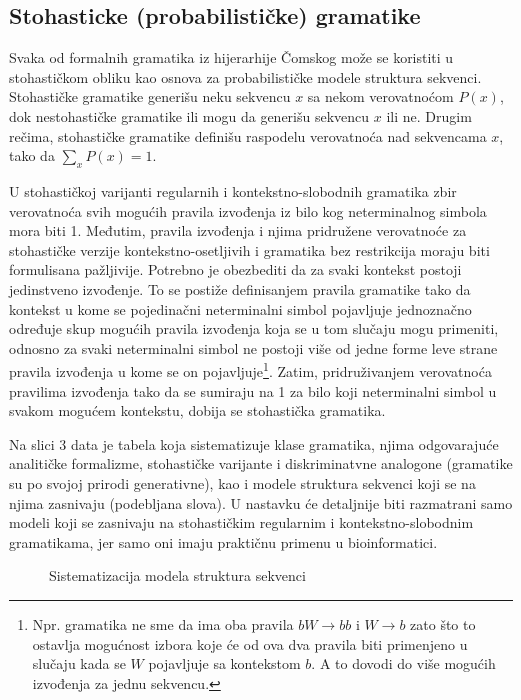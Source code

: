 \documentclass[a4paper, 12pt]{article}
\begin{document}
\subsection{Stohasticke (probabilističke) gramatike}

Svaka od formalnih gramatika iz hijerarhije Čomskog može se koristiti u stohastičkom obliku kao osnova za probabilističke modele struktura sekvenci. Stohastičke gramatike generišu neku sekvencu $x$ sa nekom verovatnoćom $P(x)$, dok nestohastičke gramatike ili mogu da generišu sekvencu $x$ ili ne. Drugim rečima, stohastičke gramatike definišu raspodelu verovatnoća nad sekvencama $x$, tako da $\sum_x P(x) = 1$.

U stohastičkoj varijanti regularnih i kontekstno-slobodnih gramatika zbir verovatnoća svih mogućih pravila izvođenja iz bilo kog neterminalnog simbola mora biti 1. Međutim, pravila izvođenja i njima pridružene verovatnoće za stohastičke verzije kontekstno-osetljivih i gramatika bez restrikcija moraju biti formulisana pažljivije. Potrebno je obezbediti da za svaki kontekst postoji jedinstveno izvođenje. To se postiže definisanjem pravila gramatike tako da kontekst u kome se pojedinačni neterminalni simbol pojavljuje jednoznačno određuje skup mogućih pravila izvođenja koja se u tom slučaju mogu primeniti, odnosno za svaki neterminalni simbol ne postoji više od jedne forme leve strane pravila izvođenja u kome se on pojavljuje\footnote{Npr. gramatika ne sme da ima oba pravila $bW \rightarrow bb$ i $W \rightarrow b$ zato što to ostavlja mogućnost izbora koje će od ova dva pravila biti primenjeno u slučaju kada se $W$ pojavljuje sa kontekstom $b$. A to dovodi do više mogućih izvođenja za jednu sekvencu.}. Zatim, pridruživanjem verovatnoća pravilima izvođenja tako da se sumiraju na 1 za bilo koji neterminalni simbol u svakom mogućem kontekstu, dobija se stohastička gramatika.

Na slici 3 data je tabela koja sistematizuje klase gramatika, njima odgovarajuće analitičke formalizme, stohastičke varijante i diskriminatvne analogone (gramatike su po svojoj prirodi generativne), kao i modele struktura sekvenci koji se na njima zasnivaju (podebljana slova). U nastavku će detaljnije biti razmatrani samo modeli koji se zasnivaju na stohastičkim regularnim i kontekstno-slobodnim gramatikama, jer samo oni imaju praktičnu primenu u bioinformatici.

\begin{figure}[h!]
    \centering
    \vspace{0.15cm}
    \vspace{0.2cm}
    \caption{Sistematizacija modela struktura sekvenci}
\end{figure}
\end{document}
